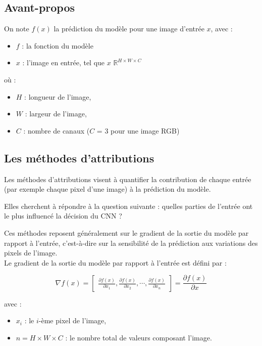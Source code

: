 \documentclass{ir}
\begin{document}
\subsection*{Avant-propos}

On note $f(x)$ la prédiction du modèle pour une image d'entrée $x$, avec :

\begin{itemize}
    \item $f$ : la fonction du modèle
    \item $x$ : l'image en entrée, tel que $x$ \in $\mathbb{R}^{H \times W \times C}$
\end{itemize}

où :

\begin{itemize}
    \item $H$ : longueur de l'image,
    \item $W$ : largeur de l'image,
    \item $C$ : nombre de canaux ($C$ = 3 pour une image RGB)
\end{itemize}

\subsection{Les méthodes d'attributions}\label{subsec:attributions}

Les méthodes d'attributions visent à quantifier la contribution de chaque entrée (par exemple chaque pixel d'une image) à la prédiction du modèle.

Elles cherchent à répondre à la question suivante : quelles parties de l'entrée ont le plus influencé la décision du CNN ?

Ces méthodes reposent généralement sur le gradient de la sortie du modèle par rapport à l'entrée, c'est-à-dire sur la sensibilité de la prédiction aux variations des pixels de l'image.\\

Le gradient de la sortie du modèle par rapport à l'entrée est défini par :

\begin{equation}
\nabla f(x) =
\begin{bmatrix}
\frac{\partial f(x)}{\partial x_1},
\frac{\partial f(x)}{\partial x_2},
\cdots,
\frac{\partial f(x)}{\partial x_n}
\end{bmatrix}
=
\frac{\partial f(x)}{\partial x}
\end{equation}

avec :
\begin{itemize}
    \item $x_i$ : le $i$-ème pixel de l'image,
    \item $n = H \times W \times C$ : le nombre total de valeurs composant l'image.\\
\end{itemize}
\end{document}
